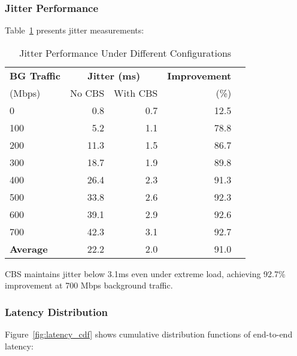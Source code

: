 \documentclass[10pt, journal, compsoc]{IEEEtran}
\begin{document}
\subsubsection{Jitter Performance}

Table~\ref{tab:jitter_results} presents jitter measurements:

\begin{table}[h]
\centering
\caption{Jitter Performance Under Different Configurations}
\label{tab:jitter_results}
\begin{tabular}{lrrrr}
\toprule
\textbf{BG Traffic} & \multicolumn{2}{c}{\textbf{Jitter (ms)}} & \textbf{Improvement} \\
\cmidrule(lr){2-3}
(Mbps) & No CBS & With CBS & (\%) \\
\midrule
0 & 0.8 & 0.7 & 12.5 \\
100 & 5.2 & 1.1 & 78.8 \\
200 & 11.3 & 1.5 & 86.7 \\
300 & 18.7 & 1.9 & 89.8 \\
400 & 26.4 & 2.3 & 91.3 \\
500 & 33.8 & 2.6 & 92.3 \\
600 & 39.1 & 2.9 & 92.6 \\
700 & 42.3 & 3.1 & 92.7 \\
\midrule
\textbf{Average} & 22.2 & 2.0 & 91.0 \\
\bottomrule
\end{tabular}
\end{table}

CBS maintains jitter below 3.1ms even under extreme load, achieving 92.7\% improvement at 700 Mbps background traffic.

\subsubsection{Latency Distribution}

Figure~\ref{fig:latency_cdf} shows cumulative distribution functions of end-to-end latency:
\end{document}
